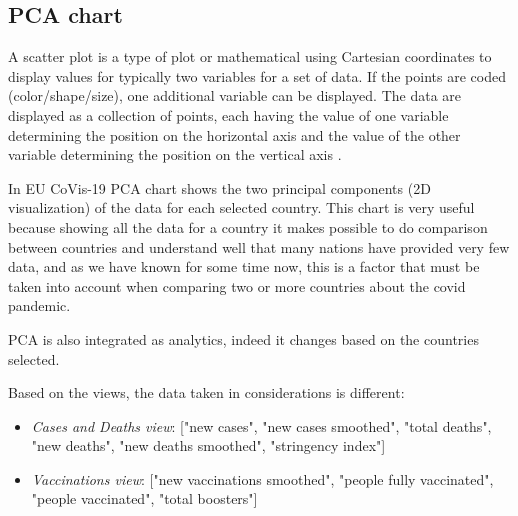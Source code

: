 \documentclass[10pt,conference]{IEEEtran}
\begin{document}
\begin{figure}
\end{figure}

\subsection{PCA chart}
A scatter plot is a type of plot or mathematical
using Cartesian coordinates to display values for typically two variables for a set of data. If the points are coded (color/shape/size), 
one additional variable can be displayed. The data are displayed as a collection of points, each having the value of one variable 
determining the position on the horizontal axis and the value of the other variable determining the position on the vertical axis \cite{scatter}.

In EU CoVis-19 PCA chart shows the two principal components (2D visualization) of the data for each selected country. This chart is very useful because showing all the data for a country it makes possible to do comparison between 
countries and understand well that many nations have provided very few data, and as we have known for some time now, this is a factor that must be taken into account when comparing two or more countries about the covid pandemic.

PCA is also integrated as analytics, indeed it changes based on the countries selected.

Based on the views, the data taken in considerations is different:
\begin{itemize}
	\item {\em Cases and Deaths view}: ["new cases", "new cases smoothed", "total deaths", "new deaths", "new deaths smoothed", "stringency index"]
	\item {\em Vaccinations view}: ["new vaccinations smoothed", "people fully vaccinated", "people vaccinated", "total boosters"]
\end{itemize}
\end{document}
